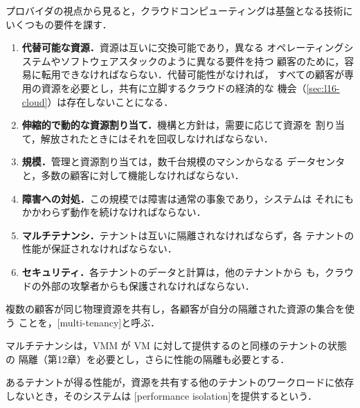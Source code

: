 \documentclass[../main.tex]{subfiles}
\begin{document}
プロバイダの視点から見ると，クラウドコンピューティングは基盤となる技術に
いくつもの要件を課す．
\begin{enumerate}
  \item \textbf{代替可能な資源．}資源は互いに交換可能であり，異なる
    オペレーティングシステムやソフトウェアスタックのように異なる要件を持つ
    顧客のために，容易に転用できなければならない．代替可能性がなければ，
    すべての顧客が専用の資源を必要とし，共有に立脚するクラウドの経済的な
    機会（\cref{sec:l16-cloud}）は存在しないことになる．
  \item \textbf{伸縮的で動的な資源割り当て．}機構と方針は，需要に応じて資源を
    割り当て，解放されたときにはそれを回収しなければならない．
  \item \textbf{規模．}管理と資源割り当ては，数千台規模のマシンからなる
    データセンタと，多数の顧客に対して機能しなければならない．
  \item \textbf{障害への対処．}この規模では障害は通常の事象であり，システムは
    それにもかかわらず動作を続けなければならない．
  \item \textbf{マルチテナンシ．}テナントは互いに隔離されなければならず，各
    テナントの性能が保証されなければならない．
  \item \textbf{セキュリティ．}各テナントのデータと計算は，他のテナントから
    も，クラウドの外部の攻撃者からも保護されなければならない．
\end{enumerate}

\begin{definition}[マルチテナンシ]
  複数の顧客が同じ物理資源を共有し，各顧客が自分の隔離された資源の集合を使う
  ことを，[multi-tenancy]と呼ぶ．
\end{definition}

マルチテナンシは，VMM が VM に対して提供するのと同様のテナントの状態の
隔離（第12章）を必要とし，さらに性能の隔離も必要とする．

\begin{definition}[性能隔離]
  あるテナントが得る性能が，資源を共有する他のテナントのワークロードに依存
  しないとき，そのシステムは%
  [performance isolation]を提供するという．
\end{definition}
\end{document}

